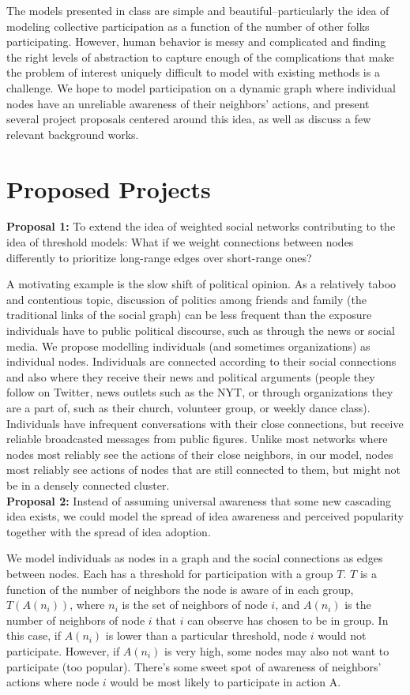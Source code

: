   The models presented in class are simple and beautiful--particularly the idea of modeling collective participation as a function of the number of other folks participating. However, human behavior is messy and complicated and finding the right levels of abstraction to capture enough of the complications that make the problem of interest uniquely difficult to model with existing methods is a challenge. We hope to model participation on a dynamic graph where individual nodes have an unreliable awareness of their neighbors’ actions, and present several project proposals centered around this idea, as well as discuss a few relevant background works.

\section{Proposed Projects}


\textbf{Proposal 1: }To extend the idea of weighted social networks contributing to the idea of threshold models: What if we weight connections between nodes differently to prioritize long-range edges over short-range ones? 

A motivating example is the slow shift of political opinion. As a relatively taboo and contentious topic, discussion of politics among friends and family (the traditional links of  the social graph) can be less frequent than the exposure individuals have to public political discourse, such as through the news or social media. We propose modelling individuals (and sometimes organizations) as individual nodes. Individuals are connected according to their social connections and also where they receive their news and political arguments (people they follow on Twitter, news outlets such as the NYT, or through organizations they are a part of, such as their church, volunteer group, or weekly dance class). Individuals have infrequent conversations with their close connections, but receive reliable broadcasted messages from public figures. Unlike most networks where nodes most reliably see the actions of their close neighbors, in our model, nodes most reliably see actions of nodes that are still connected to them, but might not be in a densely connected cluster. \\

\textbf{Proposal 2: }Instead of assuming universal awareness that some new cascading idea exists, we could model the spread of idea awareness and perceived popularity together with the spread of idea adoption.

We model individuals as nodes in a graph and the social connections as edges between nodes. Each has a threshold for participation with a group $T$. $T$ is a function of the number of neighbors the node is aware of in each group, $T(A(n_i))$, where $n_i$ is the set of neighbors of node $i$, and $A(n_i)$ is the number of neighbors of node $i$ that $i$ can observe has chosen to be in group. In this case, if $A(n_i)$ is lower than a particular threshold, node $i$ would not participate. However, if $A(n_i)$ is very high, some nodes may also not want to participate (too popular). There’s some sweet spot of awareness of neighbors' actions where node $i$ would be most likely to participate in action A.\\

